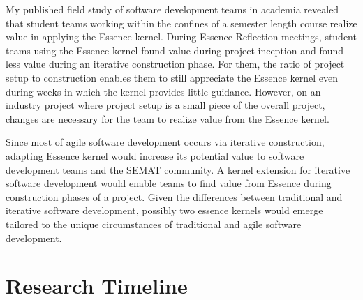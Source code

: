 \documentclass[preprint,12pt,3p]{elsarticle}
\begin{document}
My published field study of software development teams in academia revealed that student teams working within the confines of a semester length course realize value in applying the Essence kernel. During Essence Reflection meetings, student teams using the Essence kernel found value during project inception and found less value during an iterative construction phase. For them, the ratio of project setup to construction enables them to still appreciate the Essence kernel even during weeks in which the kernel provides little guidance. However, on an industry project where project setup is a small piece of the overall project, changes are necessary for the team to realize value from the Essence kernel.

Since most of agile software development occurs via iterative construction, adapting Essence kernel would increase its potential value to software development teams and the SEMAT community. A kernel extension for iterative software development would enable teams to find value from Essence during construction phases of a project. Given the differences between traditional and iterative software development, possibly two essence kernels would emerge tailored to the unique circumstances of traditional and agile software development.

\appendix
\section{Research Timeline}
\label{appendix}
\end{document}
